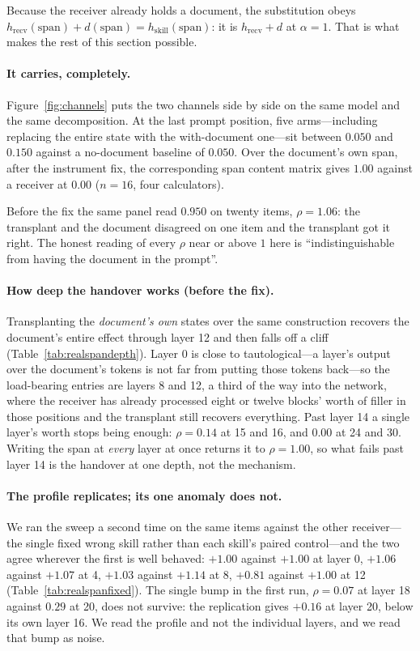 \documentclass{article}
\newcommand{\dvec}{\ensuremath{d}}
\begin{document}
Because the receiver already holds a document, the substitution obeys
$h_{\text{recv}}(\text{span}) + \dvec(\text{span}) = h_{\text{skill}}(\text{span})$: it is $h_{\text{recv}} + \dvec$ at $\alpha=1$. That is
what makes the rest of this section possible.

\paragraph{It carries, completely.} Figure~\ref{fig:channels} puts the two
channels side by side on the same model and the same decomposition. At the last
prompt position, five arms---including replacing the entire state with the
with-document one---sit between $0.050$ and $0.150$ against a no-document
baseline of $0.050$. Over the document's own span, after the instrument fix,
the corresponding span content matrix gives $1.00$ against a receiver at $0.00$ ($n=16$, four
calculators).

Before the fix the same panel read $0.950$ on twenty items, $\rho = 1.06$: the
transplant and the document disagreed on one item and the transplant got it
right. The honest reading of every $\rho$ near or above $1$ here is
``indistinguishable from having the document in the prompt''.



\paragraph{How deep the handover works (before the fix).} Transplanting the \emph{document's own}
states over the same construction recovers the document's entire effect through
layer 12 and then falls off a cliff (Table~\ref{tab:realspandepth}). Layer 0 is
close to tautological---a layer's output over the document's tokens is not far
from putting those tokens back---so the load-bearing entries are layers 8 and
12, a third of the way into
the network, where the receiver has already processed eight or twelve blocks'
worth of filler in those positions and the transplant still recovers
everything. Past layer 14 a single layer's worth stops being enough: $\rho =
0.14$ at 15 and 16, and $0.00$ at 24 and 30. Writing
the span at \emph{every} layer at once returns it to $\rho = 1.00$, so what
fails past layer 14 is the handover at one depth, not the mechanism.

\paragraph{The profile replicates; its one anomaly does not.} We ran the sweep a
second time on the same items against the other receiver---the single fixed
wrong skill rather than each skill's paired control---and the two agree wherever
the first is well behaved: $+1.00$ against $+1.00$ at layer 0, $+1.06$ against
$+1.07$ at 4, $+1.03$ against $+1.14$ at 8, $+0.81$ against $+1.00$ at 12
(Table~\ref{tab:realspanfixed}). The single bump in the first run, $\rho=0.07$
at layer 18 against $0.29$ at 20, does not survive: the replication gives $+0.16$
at layer 20, below its own layer 16. We read the profile and not the individual
layers, and we read that bump as noise.
\end{document}
